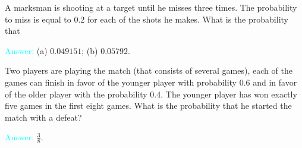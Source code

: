 \documentclass[14pt]{exam}
\begin{document}
\begin{questions}
		
		
		
		
		
		\question
		A marksman is shooting at a target until he misses three times. The probability to miss is equal to 0.2 for each of the shots he makes. What is the probability that
		
		
		\textcolor{cyan}{Answer:} (a) $0.049151$; (b) $0.05792$.
		
		\question
		Two players are playing the match (that consists of several games), each of the games can finish in favor of the younger player with probability 0.6 and in favor of the older player with the probability 0.4. The younger player has won exactly five games in the first eight games. What is the probability that he started the match with a defeat?
		
		\textcolor{cyan}{Answer:} $\frac{3}{8}$.
		
		
 	\end{questions}
\end{document}
